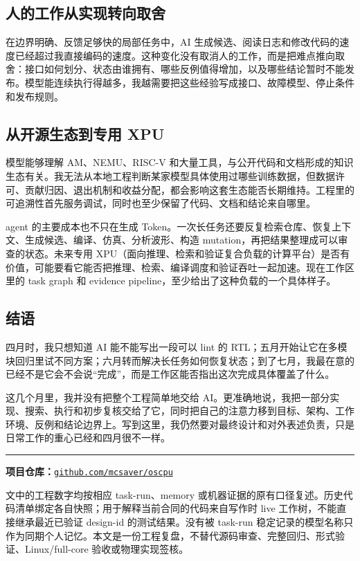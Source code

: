 \documentclass[UTF8,a4paper,zihao=-4,oneside]{ctexart}
\begin{document}
\subsection{人的工作从实现转向取舍}

在边界明确、反馈足够快的局部任务中，AI 生成候选、阅读日志和修改代码的速度已经超过我直接编码的速度。这种变化没有取消人的工作，而是把难点推向取舍：接口如何划分、状态由谁拥有、哪些反例值得增加，以及哪些结论暂时不能发布。模型能连续执行得越多，我越需要把这些经验写成接口、故障模型、停止条件和发布规则。

\subsection{从开源生态到专用 XPU}

模型能够理解 AM、NEMU、RISC-V 和大量工具，与公开代码和文档形成的知识生态有关。我无法从本地工程判断某家模型具体使用过哪些训练数据，但数据许可、贡献归因、退出机制和收益分配，都会影响这套生态能否长期维持。工程里的可追溯性首先服务调试，同时也至少保留了代码、文档和结论来自哪里。

agent 的主要成本也不只在生成 Token。一次长任务还要反复检索仓库、恢复上下文、生成候选、编译、仿真、分析波形、构造 mutation，再把结果整理成可以审查的状态。未来专用 XPU（面向推理、检索和验证复合负载的计算平台）是否有价值，可能要看它能否把推理、检索、编译调度和验证吞吐一起加速。现在工作区里的 task graph 和 evidence pipeline，至少给出了这种负载的一个具体样子。

\subsection{结语}

四月时，我只想知道 AI 能不能写出一段可以 lint 的 RTL；五月开始让它在多模块回归里试不同方案；六月转而解决长任务如何恢复状态；到了七月，我最在意的已经不是它会不会说“完成”，而是工作区能否指出这次完成具体覆盖了什么。

这几个月里，我并没有把整个工程简单地交给 AI。更准确地说，我把一部分实现、搜索、执行和初步复核交给了它，同时把自己的注意力移到目标、架构、工作环境、反例和结论边界上。写到这里，我仍然要对最终设计和对外表述负责，只是日常工作的重心已经和四月很不一样。

\vspace{.8em}
\noindent\rule{\linewidth}{0.4pt}

\noindent\textbf{项目仓库：}\href{https://github.com/mcsaver/oscpu}{\texttt{github.com/mcsaver/oscpu}}

\smallskip
\noindent{}
文中的工程数字均按相应 task-run、memory 或机器证据的原有口径复述。历史代码清单绑定各自快照；用于解释当前合同的代码来自写作时 live 工作树，不能直接继承最近已验证 design-id 的测试结果。没有被 task-run 稳定记录的模型名称只作为同期个人记忆。本文是一份工程复盘，不替代源码审查、完整回归、形式验证、Linux/full-core 验收或物理实现签核。
\end{document}
